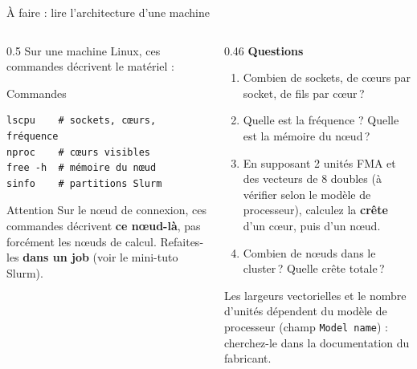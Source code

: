 \documentclass[8pt,aspectratio=169]{beamer}
\begin{document}
\begin{frame}[fragile]{À faire : lire l'architecture d'une machine}
\begin{columns}[T]
\begin{column}{0.5\textwidth}
Sur une machine Linux, ces commandes décrivent le matériel :
\begin{block}{Commandes}
\begin{verbatim}
lscpu    # sockets, cœurs, fréquence
nproc    # cœurs visibles
free -h  # mémoire du nœud
sinfo    # partitions Slurm
\end{verbatim}
\end{block}
\begin{alertblock}{Attention}
Sur le nœud de connexion, ces commandes décrivent \textbf{ce nœud-là}, pas forcément les nœuds de calcul. Refaites-les \textbf{dans un job} (voir le mini-tuto Slurm).
\end{alertblock}
\end{column}
\begin{column}{0.46\textwidth}
\textbf{Questions}
\begin{enumerate}
\item Combien de sockets, de cœurs par socket, de fils par cœur\,?
\item Quelle est la fréquence ? Quelle est la mémoire du nœud\,?
\item En supposant 2 unités FMA et des vecteurs de 8 doubles (à vérifier selon le modèle de processeur), calculez la \textbf{crête} d'un cœur, puis d'un nœud.
\item Combien de nœuds dans le cluster\,? Quelle crête totale\,?
\end{enumerate}
\medskip
Les largeurs vectorielles et le nombre d'unités dépendent du modèle de processeur (champ \texttt{Model name}) : cherchez-le dans la documentation du fabricant.
\end{column}
\end{columns}
\end{frame}
\end{document}
